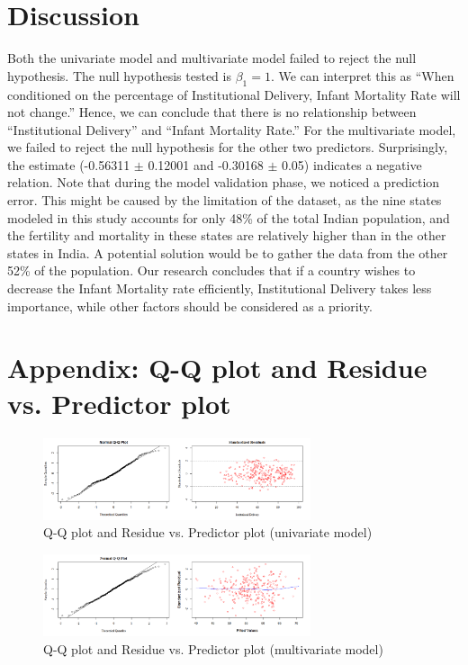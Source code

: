 \documentclass{article}
\begin{document}
\section{Discussion}
Both the univariate model and multivariate model failed to reject the null hypothesis. The null hypothesis tested is $\beta_1=1$. We can interpret this as ``When conditioned on the percentage of Institutional Delivery, Infant Mortality Rate will not change.'' Hence, we can conclude that there is no relationship between ``Institutional Delivery'' and ``Infant Mortality Rate.'' For the multivariate model, we failed to reject the null hypothesis for the other two predictors. Surprisingly, the estimate (-0.56311 $\pm$ 0.12001 and -0.30168 $\pm$ 0.05) indicates a negative relation. Note that during the model validation phase, we noticed a prediction error. This might be caused by the limitation of the dataset, as the nine states modeled in this study accounts for only 48\% of the total Indian population, and the fertility and mortality in these states are relatively higher than in the other states in India. A potential solution would be to gather the data from the other 52\% of the population. Our research concludes that if a country wishes to decrease the Infant Mortality rate efficiently, Institutional Delivery takes less importance, while other factors should be considered as a priority. 




\appendix

\section{Appendix: Q-Q plot and Residue vs. Predictor plot}
\label{appendix:qq1}
\begin{figure}[!ht]
    \centering
    \includegraphics[width=0.7\textwidth]{qq+res uni.png}
    \caption{\label{fig:}Q-Q plot and Residue vs. Predictor plot (univariate model)}
\end{figure}

\label{appendix:qq2}
\begin{figure}[!ht]
    \centering
    \includegraphics[width=0.7\textwidth]{qq+res multi.png}
    \caption{\label{fig:}Q-Q plot and Residue vs. Predictor plot (multivariate model)}
\end{figure}
\end{document}
